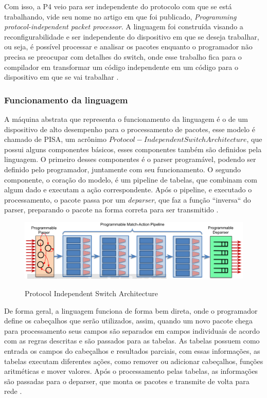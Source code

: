 \documentclass[
    12pt,
    openright, 
    oneside,
    a4paper,
    french,
    english,
    brazil
    ]{facom-ufu-abntex2}
\theoremstyle{definition}
\begin{document}
Com isso, a P4 veio para ser independente do protocolo com que se está trabalhando,
vide seu nome no artigo em que foi publicado, 
\emph{Programming protocol-independent packet processor}. A linguagem foi 
construída visando a reconfigurabilidade e ser independente do dispositivo em que se 
deseja trabalhar, ou seja, é possível processar e analisar os pacotes enquanto o programador
não precisa se preocupar com detalhes do switch, onde esse trabalho fica para o compilador 
em transformar um código independente em um código para o dispositivo em que se vai 
trabalhar \cite{bosshart2014p4}.

\subsubsection{Funcionamento da linguagem}

A máquina abstrata que representa o funcionamento da linguagem é o de um dispositivo
de alto desempenho para o processamento de pacotes, esse modelo é chamado de PISA,
um acrônimo $Protocol-Independent Switch Architecture$, que possui alguns componentes
básicos, esses componentes também são definidos pela linguagem. O primeiro desses 
componentes é o parser programável, podendo ser definido pelo programador, juntamente 
com seu funcionamento. O segundo componente, o coração do modelo, é um pipeline de tabelas,
que combinam com algum dado e executam a ação correspondente. Após o pipeline, e executado
o processamento, o pacote passa por um \emph{deparser}, que faz a função ``inversa``  do parser, 
preparando o pacote na forma correta para ser transmitido \cite{p4LangTutorial}.


\begin{figure}[ht]
    \caption{Protocol Independent Switch Architecture \cite{paxos14spec}}
    \centering
    \includegraphics[width=\textwidth]{images/pisa.png}
    \label{fig:pisa-model}
\end{figure}

De forma geral, a linguagem funciona de forma bem direta, onde o programador define
os cabeçalhos que serão utilizados, assim, quando um novo pacote chega para processamento
seus campos são separados em campos individuais de acordo com as regras descritas e são
passados para as tabelas. As tabelas possuem como entrada os campos do cabeçalhos e 
resultados parciais, com essas informações, as tabelas executam diferentes ações,
como remover ou adicionar cabeçalhos, funções aritméticas e mover valores. Após o 
processamento pelas tabelas, as informações são passadas para o deparser, que 
monta os pacotes e transmite de volta para rede \cite{p4LangTutorial}.
\end{document}
